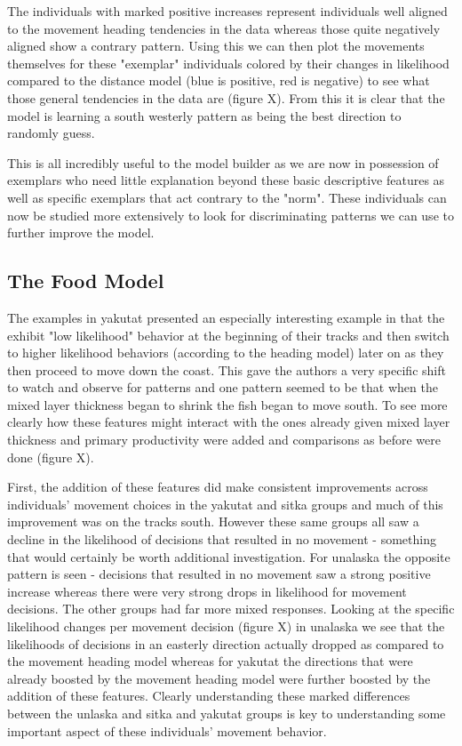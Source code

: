 \documentclass[11pt]{article}
\begin{document}
The individuals with marked positive increases represent individuals well aligned to the movement heading tendencies in the data whereas those quite negatively aligned show a contrary pattern. Using this we can then plot the movements themselves for these "exemplar" individuals colored by their changes in likelihood compared to the distance model (blue is positive, red is negative) to see what those general tendencies in the data are (figure X). From this it is clear that the model is learning a south westerly pattern as being the best direction to randomly guess. 

This is all incredibly useful to the model builder as we are now in possession of exemplars who need little explanation beyond these basic descriptive features as well as specific exemplars that act contrary to the "norm". These individuals can now be studied more extensively to look for discriminating patterns we can use to further improve the model.  

\subsection*{The Food Model}

The examples in yakutat presented an especially interesting example in that the exhibit "low likelihood" behavior at the beginning of their tracks and then switch to higher likelihood behaviors (according to the heading model) later on as they then proceed to move down the coast. This gave the authors a very specific shift to watch and observe for patterns and one pattern seemed to be that when the mixed layer thickness began to shrink the fish began to move south. To see more clearly how these features might interact with the ones already given mixed layer thickness and primary productivity were added and comparisons as before were done (figure X). 

First, the addition of these features did make consistent improvements across individuals' movement choices in the yakutat and sitka groups and much of this improvement was on the tracks south. However these same groups all saw a decline in the likelihood of decisions that resulted in no movement - something that would certainly be worth additional investigation. For unalaska the opposite pattern is seen - decisions that resulted in no movement saw a strong positive increase whereas there were very strong drops in likelihood for movement decisions. The other groups had far more mixed responses. Looking at the specific likelihood changes per movement decision (figure X) in unalaska we see that the likelihoods of decisions in an easterly direction actually dropped as compared to the movement heading model whereas for yakutat the directions that were already boosted by the movement heading model were further boosted by the addition of these features. Clearly understanding these marked differences between the unlaska and sitka and yakutat groups is key to understanding some important aspect of these individuals' movement behavior.
\end{document}
